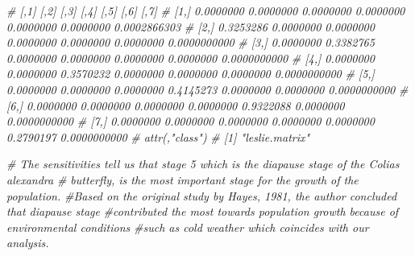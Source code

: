 \documentclass[]{article}
\newenvironment{Shaded}{\begin{snugshade}}{\end{snugshade}}
\newcommand{\CommentTok}[1]{\textcolor[rgb]{0.56,0.35,0.01}{\textit{#1}}}
\begin{document}
\begin{Shaded}
\begin{Highlighting}[]
\CommentTok{#           [,1]      [,2]      [,3]      [,4]      [,5]      [,6]         [,7]}
\CommentTok{# [1,] 0.0000000 0.0000000 0.0000000 0.0000000 0.0000000 0.0000000 0.0002866303}
\CommentTok{# [2,] 0.3253286 0.0000000 0.0000000 0.0000000 0.0000000 0.0000000 0.0000000000}
\CommentTok{# [3,] 0.0000000 0.3382765 0.0000000 0.0000000 0.0000000 0.0000000 0.0000000000}
\CommentTok{# [4,] 0.0000000 0.0000000 0.3570232 0.0000000 0.0000000 0.0000000 0.0000000000}
\CommentTok{# [5,] 0.0000000 0.0000000 0.0000000 0.4145273 0.0000000 0.0000000 0.0000000000}
\CommentTok{# [6,] 0.0000000 0.0000000 0.0000000 0.0000000 0.9322088 0.0000000 0.0000000000}
\CommentTok{# [7,] 0.0000000 0.0000000 0.0000000 0.0000000 0.0000000 0.2790197 0.0000000000}
\CommentTok{# attr(,"class")}
\CommentTok{# [1] "leslie.matrix"}

\CommentTok{# The sensitivities tell us that stage 5 which is the diapause stage of the Colias alexandra}
\CommentTok{# butterfly, is the most important stage for the growth of the population. }
\CommentTok{#Based on the original study by Hayes, 1981, the author concluded that diapause stage}
\CommentTok{#contributed the most towards population growth because of environmental conditions}
\CommentTok{#such as cold weather which coincides with our analysis.}
\end{Highlighting}
\end{Shaded}
\end{document}
